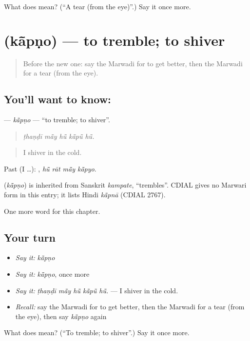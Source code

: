 \begin{tcolorbox}[breakable,colback=teal!4,colframe=teal!35!black,title={Before you move on}]
What does  mean? (\textquotedblleft{}A tear (from the eye)\textquotedblright{}.) Say it once more.
\end{tcolorbox}
\section[\texorpdfstring{\mw{कांपणो} (kā̃pṇo)}{कांपणो (kā̃pṇo)}]{ (kā̃pṇo) — to tremble; to shiver}

\label{lesson:MW-C255-kapno}



\begin{quote}
Before the new one: say the Marwadi for to get better, then the Marwadi for a tear (from the eye).
\end{quote}

\subsection*{You'll want to know: }
\textbf{} — \emph{kā̃pṇo} — \textquotedblleft{}to tremble; to shiver\textquotedblright{}.

\begin{quote}
    
\end{quote}

\begin{quote}
\emph{ṭhaṇḍī mā̃y hū̃ kā̃pū̃ hū̃.}
\end{quote}

\begin{quote}
I shiver in the cold.
\end{quote}

Past (I …):    , \emph{hū̃ rāt mā̃y kā̃pyo}.

\begin{cousinweb}
\textbf{} (\emph{kā̃pṇo}) is inherited from Sanskrit \emph{kampate}, \textquotedblleft{}trembles\textquotedblright{}. CDIAL gives no Marwari form in this entry; it lists Hindi \emph{kā̃pnā} (CDIAL 2767).
\end{cousinweb}

\begin{grammarlens}[title={What you've built}]
One more word for this chapter.
\end{grammarlens}

\subsection*{Your turn}
\begin{itemize}
\raggedright
  \item \emph{Say it:} \emph{kā̃pṇo}
  \item \emph{Say it:} \emph{kā̃pṇo}, once more
  \item \emph{Say it:} \emph{ṭhaṇḍī mā̃y hū̃ kā̃pū̃ hū̃.} — I shiver in the cold.
  \item \emph{Recall:} say the Marwadi for to get better, then the Marwadi for a tear (from the eye), then say \emph{kā̃pṇo} again
\end{itemize}

\begin{tcolorbox}[breakable,colback=teal!4,colframe=teal!35!black,title={Before you move on}]
What does  mean? (\textquotedblleft{}To tremble; to shiver\textquotedblright{}.) Say it once more.
\end{tcolorbox}
